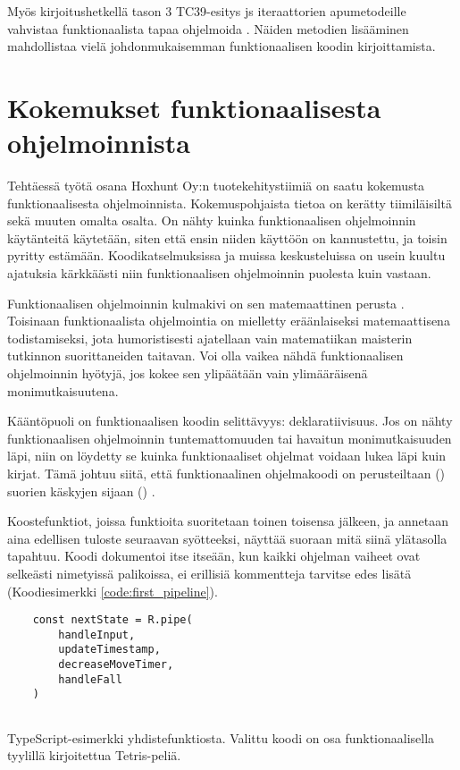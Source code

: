 Myös kirjoitushetkellä tason 3 TC39-esitys \gls{js} iteraattorien apumetodeille vahvistaa funktionaalista tapaa ohjelmoida \cite{tc39_iterator_helpers}. Näiden metodien lisääminen mahdollistaa vielä johdonmukaisemman funktionaalisen koodin kirjoittamista.

\section{Kokemukset funktionaalisesta ohjelmoinnista}


Tehtäessä työtä osana Hoxhunt Oy:n tuotekehitystiimiä on saatu kokemusta funktionaalisesta ohjelmoinnista. Kokemuspohjaista tietoa on kerätty tiimiläisiltä sekä muuten omalta osalta. On nähty kuinka funktionaalisen ohjelmoinnin käytänteitä käytetään, siten että ensin niiden käyttöön on kannustettu, ja toisin pyritty estämään. Koodikatselmuksissa ja muissa keskusteluissa on usein kuultu ajatuksia kärkkäästi niin funktionaalisen ohjelmoinnin puolesta kuin vastaan.

Funktionaalisen ohjelmoinnin kulmakivi on sen matemaattinen perusta \cite{computerphile_lambda,Tan2004}. Toisinaan funktionaalista ohjelmointia on mielletty eräänlaiseksi matemaattisena todistamiseksi, jota humoristisesti ajatellaan vain matematiikan maisterin tutkinnon suorittaneiden taitavan. Voi olla vaikea nähdä funktionaalisen ohjelmoinnin hyötyjä, jos kokee sen ylipäätään vain ylimääräisenä monimutkaisuutena.

Kääntöpuoli on funktionaalisen koodin selittävyys: deklaratiivisuus. Jos on nähty funktionaalisen ohjelmoinnin tuntemattomuuden tai havaitun monimutkaisuuden läpi, niin on löydetty se kuinka funktionaaliset ohjelmat voidaan lukea läpi kuin kirjat. Tämä johtuu siitä, että funktionaalinen ohjelmakoodi on perusteiltaan () suorien käskyjen sijaan () \cite{ms:fp_vs_imperative}.

Koostefunktiot, joissa funktioita suoritetaan toinen toisensa jälkeen, ja annetaan aina edellisen tuloste seuraavan syötteeksi, näyttää suoraan mitä siinä ylätasolla tapahtuu. Koodi dokumentoi itse itseään, kun kaikki ohjelman vaiheet ovat selkeästi nimetyissä palikoissa, ei erillisiä kommentteja tarvitse edes lisätä  (Koodiesimerkki \ref{code:first_pipeline}).

\begin{code}
    \begin{verbatim}
    const nextState = R.pipe(
        handleInput,
        updateTimestamp,
        decreaseMoveTimer,
        handleFall
    )
    
\end{verbatim}
    \caption{TypeScript-esimerkki yhdistefunktiosta. Valittu koodi on osa funktionaalisella tyylillä kirjoitettua Tetris-peliä.}
    \label{code:first_pipeline}
\end{code}


